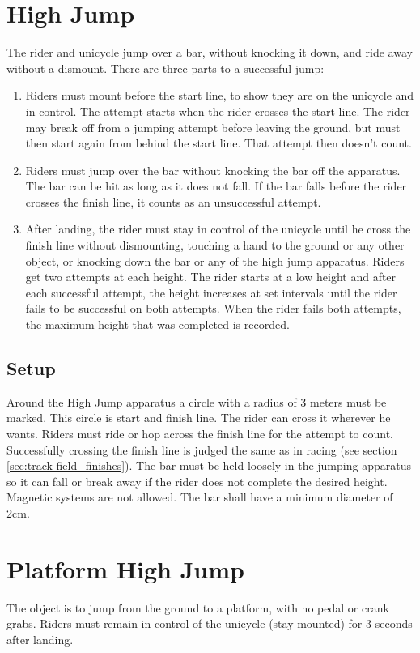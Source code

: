 \section{High Jump}
The rider and unicycle jump over a bar, without knocking it down, and ride away without a dismount.
There are three parts to a successful jump: 
\begin{enumerate}
\item Riders must mount before the start line, to show they are on the unicycle and in control.
The attempt starts when the rider crosses the start line.
The rider may break off from a jumping attempt before leaving the ground, but must then start again from behind the start line.
That attempt then doesn't count.
\item Riders must jump over the bar without knocking the bar off the apparatus.
The bar can be hit as long as it does not fall.
If the bar falls before the rider crosses the finish line, it counts as an unsuccessful attempt.
\item After landing, the rider must stay in control of the unicycle until he cross the finish line without dismounting, touching a hand to the ground or any other object, or knocking down the bar or any of the high jump apparatus.
Riders get two attempts at each height.
The rider starts at a low height and after each successful attempt, the height increases at set intervals until the rider fails to be successful on both attempts.
When the rider fails both attempts, the maximum height that was completed is recorded.
\end{enumerate}

\subsection{Setup}
Around the High Jump apparatus a circle with a radius of 3 meters must be marked.
This circle is start and finish line.
The rider can cross it wherever he wants.
Riders must ride or hop across the finish line for the attempt to count.
Successfully crossing the finish line is judged the same as in racing (see section \ref{sec:track-field_finishes}).
The bar must be held loosely in the jumping apparatus so it can fall or break away if the rider does not complete the desired height.
Magnetic systems are not allowed.
The bar shall have a minimum diameter of 2cm.

\section{Platform High Jump}
The object is to jump from the ground to a platform, with no pedal or crank grabs.
Riders must remain in control of the unicycle (stay mounted) for 3 seconds after landing.

